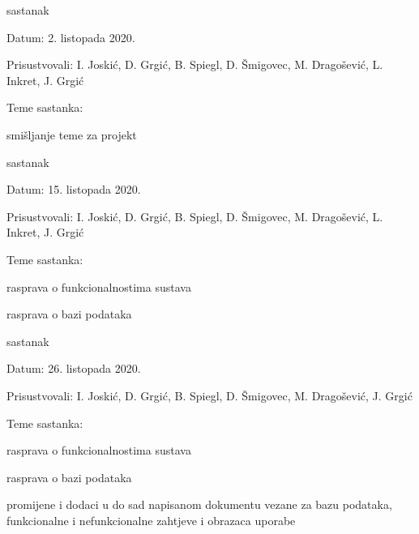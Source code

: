 \begin{packed_enum}
	\item  sastanak
	
	\item[] \begin{packed_item}
		\item Datum: 2. listopada 2020.
		\item Prisustvovali: I. Joskić, D. Grgić, B. Spiegl, D. Šmigovec, M. Dragošević, L. Inkret, J. Grgić
		\item Teme sastanka:
		\begin{packed_item}
			\item  smišljanje teme za projekt
		\end{packed_item}
	\end{packed_item}
	
	\item  sastanak
	\item[] \begin{packed_item}
		\item Datum: 15. listopada 2020.
		\item Prisustvovali: I. Joskić, D. Grgić, B. Spiegl, D. Šmigovec, M. Dragošević, L. Inkret, J. Grgić
		\item Teme sastanka:
		\begin{packed_item}
			\item  rasprava o funkcionalnostima sustava
			\item  rasprava o bazi podataka
		\end{packed_item}
	\end{packed_item}

	\item  sastanak
	\item[] \begin{packed_item}
		\item Datum: 26. listopada 2020.
		\item Prisustvovali: I. Joskić, D. Grgić, B. Spiegl, D. Šmigovec, M. Dragošević, J. Grgić
		\item Teme sastanka:
		\begin{packed_item}
			\item  rasprava o funkcionalnostima sustava
			\item  rasprava o bazi podataka
			\item  promijene i dodaci u do sad napisanom dokumentu vezane za bazu podataka, funkcionalne i nefunkcionalne zahtjeve i obrazaca uporabe
		\end{packed_item}
	\end{packed_item}


\end{packed_enum}
